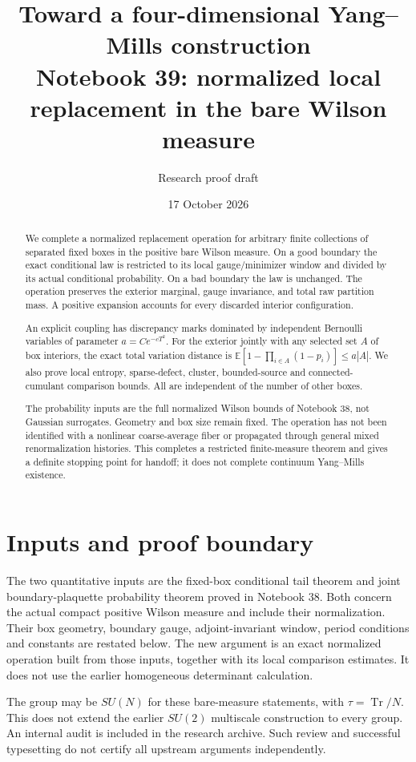 \documentclass[11pt]{article}
\title{Toward a four-dimensional Yang--Mills construction\\
\large Notebook 39: normalized local replacement in the bare Wilson measure}
\author{Research proof draft}
\date{17 October 2026}
\theoremstyle{remark}
\begin{document}
\maketitle
\begin{abstract}
We complete a normalized replacement operation for arbitrary finite
collections of separated fixed boxes in the positive bare Wilson
measure. On a good boundary the exact conditional law is restricted
to its local gauge/minimizer window and divided by its actual
conditional probability. On a bad boundary the law is unchanged.
The operation preserves the exterior marginal, gauge invariance,
and total raw partition mass. A positive expansion accounts for
every discarded interior configuration.

An explicit coupling has discrepancy marks dominated by independent
Bernoulli variables of parameter \(a=Ce^{-cT^2}\). For the exterior
jointly with any selected set \(A\) of box interiors, the exact
total variation distance is
\(\mathbb E[1-\prod_{i\in A}(1-p_i)]\le a|A|\).
We also prove local entropy, sparse-defect, cluster,
bounded-source and connected-cumulant comparison bounds. All are
independent of the number of other boxes.

The probability inputs are the full normalized Wilson bounds of
Notebook 38, not Gaussian surrogates. Geometry and box size remain
fixed. The operation has not been identified with a nonlinear
coarse-average fiber or propagated through general mixed
renormalization histories. This completes a restricted
finite-measure theorem and gives a definite stopping point for
handoff; it does not complete continuum Yang--Mills existence.
\end{abstract}

\section*{Inputs and proof boundary}

The two quantitative inputs are the fixed-box conditional tail
theorem and joint boundary-plaquette probability theorem
proved in Notebook 38. Both concern the actual compact positive
Wilson measure and include their normalization. Their box
geometry, boundary gauge, adjoint-invariant window, period
conditions and constants are restated below.
The new argument is an exact normalized operation built from
those inputs, together with its local comparison estimates.
It does not use the earlier homogeneous determinant calculation.

The group may be \(SU(N)\) for these bare-measure statements,
with \(\tau=\operatorname{Tr}/N\). This does not extend the
earlier \(SU(2)\) multiscale construction to every group.
An internal audit is included in the research archive.
Such review and successful typesetting do not certify
all upstream arguments independently.
\end{document}
